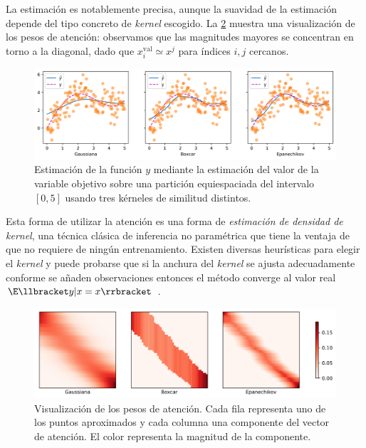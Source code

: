La estimación es notablemente precisa, aunque la suavidad de la estimación depende del tipo concreto de \textit{kernel} escogido. La \cref{fig:kernel} muestra una visualización de los pesos de atención: observamos que las magnitudes mayores se concentran en torno a la diagonal, dado que \( x^\text{val}_{i} \simeq x^j \) para índices \( i, j \) cercanos. 

\begin{figure}[tb]
    \centering
    \includegraphics[width=\textwidth]{figures/chapter4/regression.png}
    \caption{Estimación de la función \( y \) mediante la estimación del valor de la variable objetivo sobre una partición equiespaciada del intervalo \( [0, 5] \) usando tres kérneles de similitud distintos.}
    \label{fig:regression}
\end{figure}

Esta forma de utilizar la atención es una forma de \textit{estimación de densidad de kernel}, una técnica clásica de inferencia no paramétrica que tiene la ventaja de que no requiere de ningún entrenamiento. Existen diversas heurísticas para elegir el \textit{kernel} \cite{silverman1986density} y puede probarse que si la anchura del \textit{kernel} se ajusta adecuadamente conforme se añaden observaciones entonces el método converge al valor real \( \E \llbracket y | x = x \rrbracket \) \cite{mack1982weak}.

\begin{figure}[tb]
    \centering
    \includegraphics[width=\textwidth]{figures/chapter4/kernel.png}
    \caption{Visualización de los pesos de atención. Cada fila representa uno de los puntos aproximados y cada columna una componente del vector de atención. El color representa la magnitud de la componente.}
    \label{fig:kernel}
\end{figure}

